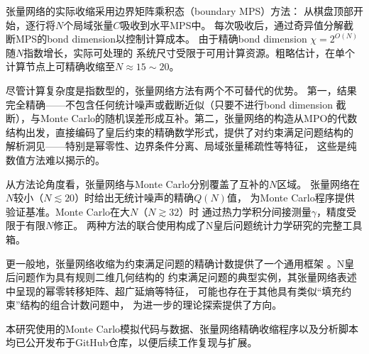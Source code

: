 张量网络的实际收缩采用边界矩阵乘积态（boundary MPS）方法\cite{Xiang2024}：
从棋盘顶部开始，逐行将$N$个局域张量$C$吸收到水平MPS中。
每次吸收后，通过奇异值分解截断MPS的bond dimension以控制计算成本。
由于精确bond dimension $\chi=2^{O(N)}$随$N$指数增长，实际可处理的
系统尺寸受限于可用计算资源。粗略估计，在单个计算节点上可精确收缩至$N\approx15\sim20$。

尽管计算复杂度是指数型的，张量网络方法有两个不可替代的优势。
第一，结果完全精确——不包含任何统计噪声或截断近似（只要不进行bond dimension
截断），与Monte Carlo的随机误差形成互补。第二，张量网络的构造从MPO的代数
结构出发，直接编码了皇后约束的精确数学形式，提供了对约束满足问题结构的
解析洞见——特别是幂零性、边界条件分离、局域张量稀疏性等特征，
这些是纯数值方法难以揭示的。

从方法论角度看，张量网络与Monte Carlo分别覆盖了互补的$N$区域。
张量网络在$N$较小（$N\lesssim20$）时给出无统计噪声的精确$Q(N)$值，
为Monte Carlo程序提供验证基准。Monte Carlo在大$N$（$N\gtrsim32$）时
通过热力学积分间接测量$\gamma$，精度受限于有限$N$修正。
两种方法的联合使用构成了N皇后问题统计力学研究的完整工具箱。

更一般地，张量网络收缩为约束满足问题的精确计数提供了一个通用框架
\cite{Kourtis2019,Vanderstraeten2018}。N皇后问题作为具有规则二维几何结构的
约束满足问题的典型实例，其张量网络表述中呈现的幂零转移矩阵、超广延熵等特征，
可能也存在于其他具有类似``填充约束''结构的组合计数问题中，
为进一步的理论探索提供了方向。

本研究使用的Monte Carlo模拟代码与数据、张量网络精确收缩程序以及分析脚本
均已公开发布于GitHub仓库\cite{github_repo}，以便后续工作复现与扩展。
